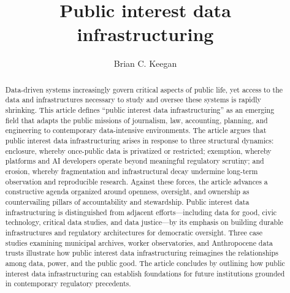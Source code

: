 \documentclass[acmsmall,screen]{acmart}
\begin{document}
\title{Public interest data infrastructuring}

\author{Brian C. Keegan}

\renewcommand{\shortauthors}{Keegan}

\begin{abstract}
Data-driven systems increasingly govern critical aspects of public life, yet access to the data and infrastructures necessary to study and oversee these systems is rapidly shrinking. This article defines ``public interest data infrastructuring'' as an emerging field that adapts the public missions of journalism, law, accounting, planning, and engineering to contemporary data-intensive environments. The article argues that public interest data infrastructuring arises in response to three structural dynamics: enclosure, whereby once-public data is privatized or restricted; exemption, whereby platforms and AI developers operate beyond meaningful regulatory scrutiny; and erosion, whereby fragmentation and infrastructural decay undermine long-term observation and reproducible research. Against these forces, the article advances a constructive agenda organized around openness, oversight, and ownership as countervailing pillars of accountability and stewardship. Public interest data infrastructuring is distinguished from adjacent efforts---including data for good, civic technology, critical data studies, and data justice---by its emphasis on building durable infrastructures and regulatory architectures for democratic oversight. Three case studies examining municipal archives, worker observatories, and Anthropocene data trusts illustrate how public interest data infrastructuring reimagines the relationships among data, power, and the public good. The article concludes by outlining how public interest data infrastructuring can establish foundations for future institutions grounded in contemporary regulatory precedents.
\end{abstract}
\end{document}
